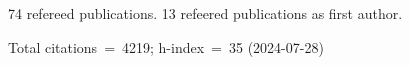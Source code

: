 74 refereed publications. 13 refeered publications as first author.

Total citations~=~4219; h-index~=~35 (2024-07-28)